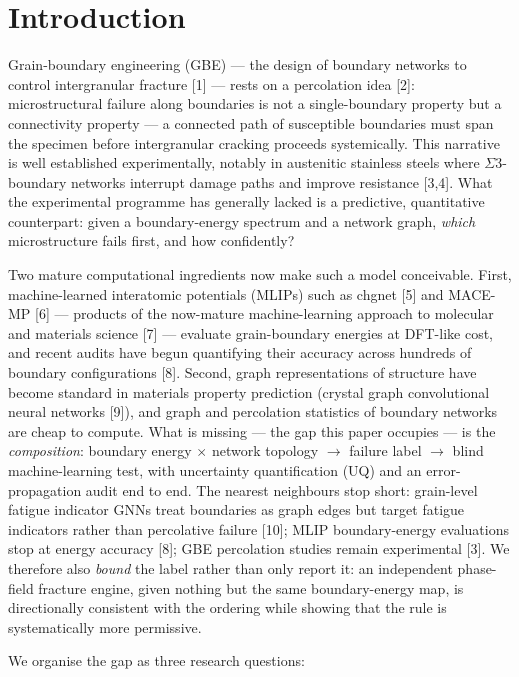 \documentclass[12pt]{article}
\begin{document}
\section{Introduction}

Grain-boundary engineering (GBE) --- the design of boundary networks to control intergranular fracture [1] --- rests on a percolation idea [2]: microstructural failure along boundaries is not a single-boundary property but a connectivity property --- a connected path of susceptible boundaries must span the specimen before intergranular cracking proceeds systemically. This narrative is well established experimentally, notably in austenitic stainless steels where $\Sigma$3-boundary networks interrupt damage paths and improve resistance [3,4]. What the experimental programme has generally lacked is a predictive, quantitative counterpart: given a boundary-energy spectrum and a network graph, \textit{which} microstructure fails first, and how confidently?

Two mature computational ingredients now make such a model conceivable. First, machine-learned interatomic potentials (MLIPs) such as chgnet [5] and MACE-MP [6] --- products of the now-mature machine-learning approach to molecular and materials science [7] --- evaluate grain-boundary energies at DFT-like cost, and recent audits have begun quantifying their accuracy across hundreds of boundary configurations [8]. Second, graph representations of structure have become standard in materials property prediction (crystal graph convolutional neural networks [9]), and graph and percolation statistics of boundary networks are cheap to compute. What is missing --- the gap this paper occupies --- is the \textit{composition}: boundary energy $\times$ network topology $\rightarrow$ failure label $\rightarrow$ blind machine-learning test, with uncertainty quantification (UQ) and an error-propagation audit end to end. The nearest neighbours stop short: grain-level fatigue indicator GNNs treat boundaries as graph edges but target fatigue indicators rather than percolative failure [10]; MLIP boundary-energy evaluations stop at energy accuracy [8]; GBE percolation studies remain experimental [3]. We therefore also \textit{bound} the label rather than only report it: an independent phase-field fracture engine, given nothing but the same boundary-energy map, is directionally consistent with the ordering while showing that the rule is systematically more permissive.

We organise the gap as three research questions:
\end{document}
